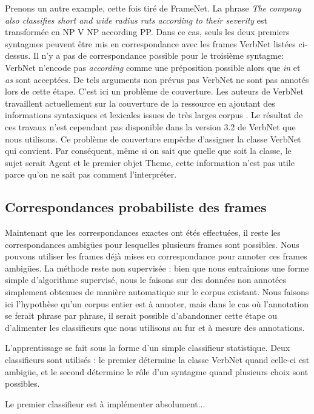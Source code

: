 Prenons un autre example, cette fois tiré de FrameNet. La phrase \emph{The
company also classifies short and wide radius ruts according to their severity}
est transformée en NP V NP according PP. Dans ce cas, seuls les deux premiers
syntagmes peuvent être mis en correspondance avec les frames VerbNet listées
ci-dessus. Il n'y a pas de correspondance possible pour le troisième syntagme:
VerbNet n'encode pas \emph{according} comme une préposition possible alors que
\emph{in} et \emph{as} sont acceptées. De tels arguments non prévus pas VerbNet
ne sont pas annotés lors de cette étape. C'est ici un problème de couverture.
Les auteurs de VerbNet travaillent actuellement sur la couverture de la
ressource en ajoutant des informations syntaxiques et lexicales issues de très
larges corpus \citep{bonial2013expanding}. Le résultat de ces travaux n'est
cependant pas disponible dans la version 3.2 de VerbNet que nous utilisons. Ce
problème de couverture empêche d'assigner la classe VerbNet qui convient. Par
conséquent, même si on sait que quelle que soit la classe, le sujet serait
Agent et le premier objet Theme, cette information n'est pas utile parce qu'on
ne sait pas comment l'interpréter.

\subsection{Correspondances probabiliste des frames}
\label{subsec:probability}

Maintenant que les correspondances exactes ont étés effectuées, il reste les
correspondances ambigües pour lesquelles plusieurs frames sont possibles.  Nous
pouvons utiliser les frames déjà mises en correspondance pour annoter ces
frames ambigües. La méthode reste non supervisée : bien que nous entraînions
une forme simple d'algorithme supervisé, nous le faisons sur des données non
annotées simplement obtenues de manière automatique sur le corpus existant.
Nous faisons ici l'hypothèse qu'un corpus entier est à annoter, mais dans le
cas où l'annotation se ferait phrase par phrase, il serait possible
d'abandonner cette étape ou d'alimenter les classifieurs que nous utilisons au
fur et à mesure des annotations.

L'apprentissage se fait sous la forme d'un simple classifieur statistique. Deux
classifieurs sont utilisés : le premier détermine la classe VerbNet quand
celle-ci est ambigüe, et le second détermine le rôle d'un syntagme quand
plusieurs choix sont possibles.

Le premier classifieur est à implémenter absolument...

